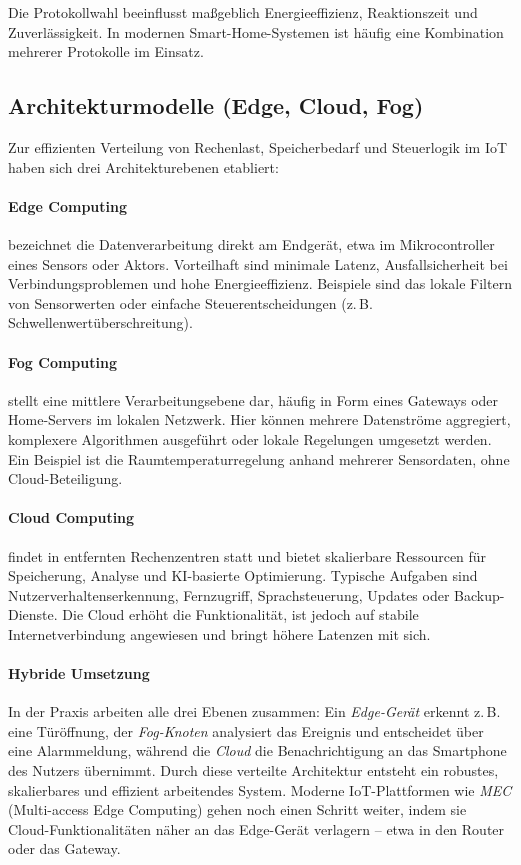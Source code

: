 \noindent Die Protokollwahl beeinflusst maßgeblich Energieeffizienz, Reaktionszeit und Zuverlässigkeit. In modernen Smart-Home-Systemen ist häufig eine Kombination mehrerer Protokolle im Einsatz.
\\
\subsection{Architekturmodelle (Edge, Cloud, Fog)}
Zur effizienten Verteilung von Rechenlast, Speicherbedarf und Steuerlogik im IoT haben sich drei Architekturebenen etabliert:
\\
\paragraph{Edge Computing} 
bezeichnet die Datenverarbeitung direkt am Endgerät, etwa im Mikrocontroller eines Sensors oder Aktors. Vorteilhaft sind minimale Latenz, Ausfallsicherheit bei Verbindungsproblemen und hohe Energieeffizienz. Beispiele sind das lokale Filtern von Sensorwerten oder einfache Steuerentscheidungen (z.\,B. Schwellenwertüberschreitung).
\\
\paragraph{Fog Computing} 
stellt eine mittlere Verarbeitungsebene dar, häufig in Form eines Gateways oder Home-Servers im lokalen Netzwerk. Hier können mehrere Datenströme aggregiert, komplexere Algorithmen ausgeführt oder lokale Regelungen umgesetzt werden. Ein Beispiel ist die Raumtemperaturregelung anhand mehrerer Sensordaten, ohne Cloud-Beteiligung.
\\
\paragraph{Cloud Computing} 
findet in entfernten Rechenzentren statt und bietet skalierbare Ressourcen für Speicherung, Analyse und KI-basierte Optimierung. Typische Aufgaben sind Nutzerverhaltenserkennung, Fernzugriff, Sprachsteuerung, Updates oder Backup-Dienste. Die Cloud erhöht die Funktionalität, ist jedoch auf stabile Internetverbindung angewiesen und bringt höhere Latenzen mit sich.
\\
\paragraph{Hybride Umsetzung} 
In der Praxis arbeiten alle drei Ebenen zusammen: Ein \emph{Edge-Gerät} erkennt z.\,B. eine Türöffnung, der \emph{Fog-Knoten} analysiert das Ereignis und entscheidet über eine Alarmmeldung, während die \emph{Cloud} die Benachrichtigung an das Smartphone des Nutzers übernimmt. Durch diese verteilte Architektur entsteht ein robustes, skalierbares und effizient arbeitendes System. Moderne IoT-Plattformen wie \emph{MEC} (Multi-access Edge Computing) gehen noch einen Schritt weiter, indem sie Cloud-Funktionalitäten näher an das Edge-Gerät verlagern – etwa in den Router oder das Gateway.
\\
